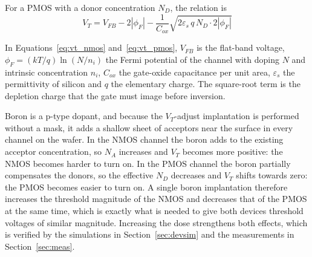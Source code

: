 For a PMOS with a donor concentration $N_D$, the relation is
\begin{equation}
V_{T} = V_{FB} - 2|\phi_F| - \frac{1}{C_{ox}}\sqrt{2\varepsilon_s\, q\, N_D \cdot 2|\phi_F|}
\label{eq:vt_pmos}
\end{equation}

In Equations~\eqref{eq:vt_nmos} and~\eqref{eq:vt_pmos}, $V_{FB}$ is the flat-band voltage, $\phi_F = (kT/q)\ln(N/n_i)$ the Fermi potential of the channel with doping $N$ and intrinsic concentration $n_i$, $C_{ox}$ the gate-oxide capacitance per unit area, $\varepsilon_s$ the permittivity of silicon and $q$ the elementary charge. The square-root term is the depletion charge that the gate must image before inversion.

Boron is a p-type dopant, and because the $V_T$-adjust implantation is performed without a mask, it adds a shallow sheet of acceptors near the surface in every channel on the wafer. In the NMOS channel the boron adds to the existing acceptor concentration, so $N_A$ increases and $V_T$ becomes more positive: the NMOS becomes harder to turn on. In the PMOS channel the boron partially compensates the donors, so the effective $N_D$ decreases and $V_T$ shifts towards zero: the PMOS becomes easier to turn on. A single boron implantation therefore increases the threshold magnitude of the NMOS and decreases that of the PMOS at the same time, which is exactly what is needed to give both devices threshold voltages of similar magnitude. Increasing the dose strengthens both effects, which is verified by the simulations in Section~\ref{sec:devsim} and the measurements in Section~\ref{sec:meas}.

\newpage